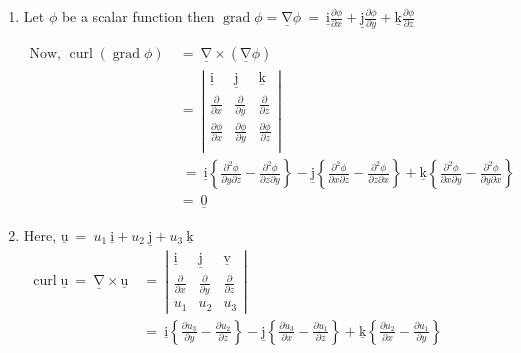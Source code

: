 \documentclass[12pt]{article}
\renewcommand{\vec}[1]{\underline{\mathrm{#1}}}
\begin{document}
\begin{enumerate}[label=\textbf{\mred{(\roman*)}}]
\item 
Let $\phi$ be a scalar function then $\operatorname{grad} \phi=\vec{\nabla} \phi
\ = \ \vec{i} \frac{\partial \phi}{\partial x}+\vec{j} \frac{\partial \phi}{\partial y}+\vec{k} \frac{\partial \phi}{\partial z}$

\vspace{1ex}
$\begin{aligned}
   \text{Now, } \operatorname{curl}\left(\operatorname{grad} \phi\right)
   \ &= \ \vec{\nabla} \times \left(\vec{\nabla} \phi\right)\\
   \ &= \ \left|\begin{array}{ccc}
      \vec{i} & \vec{j} & \vec{k} \\[1ex]
      \frac{\partial}{\partial x} & \frac{\partial}{\partial y} & \frac{\partial}{\partial z} \\[2ex]
      \frac{\partial{\phi}}{\partial x} & \frac{\partial{\phi}}{\partial y} & \frac{\partial{\phi}}{\partial z} \\
   \end{array}\right|\\[1ex]
   & \ = \ \vec{i}\left\{\frac{\partial^2 \phi}{\partial y \partial z}-\frac{\partial^2 \phi}{\partial z \partial y}\right\}-\vec{j}\left\{\frac{\partial^2 \phi}{\partial x \partial z}-\frac{\partial^2 \phi}{\partial z \partial x}\right\} + \vec{k}\left\{\frac{\partial^2 \phi}{\partial x \partial y}-\frac{\partial^2 \phi}{\partial y \partial x}\right\}
   \\
   & = \ \vec{0}
\end{aligned}$

\pagebreak
\item
Here,\quad
$ \vec{u} \ = \ u_1 \ \vec{i}+u_2 \ \vec{j}+u_3 \ \vec{k}$\\
$\begin{aligned}
   \operatorname{curl} \vec{u} \ = \ \vec{\nabla} \times \vec{u} \ &= \
   \left|\begin{array}{ccc}
      \vec{i} & \vec{j} & \vec{v} \\[1ex]
      \frac{\partial}{\partial x} & \frac{\partial}{\partial y} & \frac{\partial}{\partial z} \\[1ex]
      u_1 & u_2 & u_3
   \end{array}\right| \\[1ex]
   \ &= \ \vec{i}\left\{\frac{\partial u_3}{\partial y}-\frac{\partial u_2}{\partial z}\right\} - \vec{j}\left\{\frac{\partial u_3}{\partial x}-\frac{\partial u_1}{\partial z}\right\} + \vec{k}\left\{\frac{\partial u_2}{\partial x}-\frac{\partial u_1}{\partial y}\right\} \\
\end{aligned}$


\end{enumerate}
\end{document}
